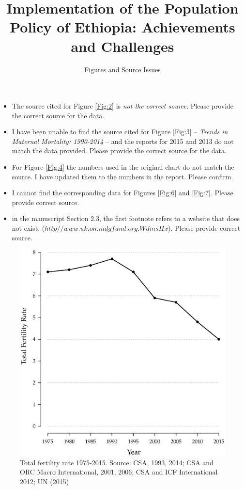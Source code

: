 \documentclass[a4paper, twocolumn]{article}
\begin{document}
\title{Implementation of the Population Policy of Ethiopia: Achievements and Challenges}
\author{Figures and Source Issues}

\maketitle

\begin{itemize}


\item The source cited for Figure  \ref{Fig:2} is \emph{not the correct source}. Please provide the correct source for the data. 

\item I have been unable to find the source cited for Figure \ref{Fig:3} -- \emph{Trends in Maternal Mortality: 1990-2014} -- and the reports for 2015 and 2013 do not match the data provided. Please provide the correct source for the data. 

\item For Figure \ref{Fig:4} the numbers used in the original chart do not match the source. I have updated them to the numbers in the report. Please confirm. 

\item I cannot find the corresponding data for Figures \ref{Fig:6} and \ref{Fig:7}. Please provide correct source. 

\item in the manuscript Section 2.3, the first footnote refers to a website that does not exist. ($http//www.uk.on.mdgfund.org.WdmsHx$). Please provide correct source. 

\end{itemize}
\begin{figure}[!hbtp]
\includegraphics[width = \columnwidth]{../figures/fig1.eps}
\caption{Total fertility rate 1975-2015. Source: CSA, 1993, 2014; CSA and ORC Macro International, 2001, 2006; CSA and ICF International 2012; UN (2015)}
\end{figure}
\end{document}
